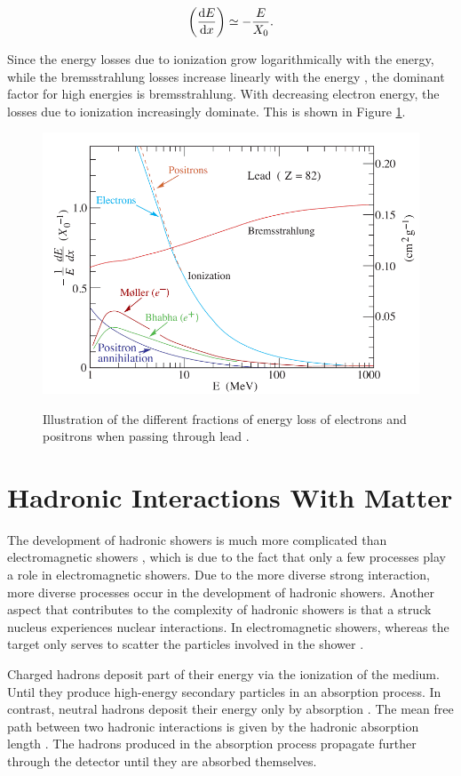 \documentclass[12pt, a4paper]{thesis}
\begin{document}
\begin{align}
\left( \dv{E}{x} \right) \simeq - \frac{E}{X_0}.
\end{align}

Since the energy losses due to ionization grow logarithmically with
the energy, while the bremsstrahlung losses increase linearly with the
energy \cite{PhysRevD.98.030001}, the dominant factor for high
energies is bremsstrahlung. With decreasing electron energy, the
losses due to ionization increasingly dominate. This is shown in
Figure \ref{bremsstrahlung}.

\begin{figure}[htbp]
\centering
\includegraphics[width=0.8 \textwidth]{../images/bremsstrahlung.png}
\label{bremsstrahlung}
\caption{ Illustration of the different fractions of energy loss of
  electrons and positrons when passing through lead
  \cite{PhysRevD.98.030001}.}
\end{figure}

\section{Hadronic Interactions With Matter}
\label{sec:org39e1a53}

The development of hadronic showers is much more complicated than
electromagnetic showers \cite{wigman18}, which is due to the fact that
only a few processes play a role in electromagnetic showers.  Due to
the more diverse strong interaction, more diverse processes occur in
the development of hadronic showers. Another aspect that contributes
to the complexity of hadronic showers is that a struck nucleus
experiences nuclear interactions. In electromagnetic showers, whereas
the target only serves to scatter the particles involved in the shower
\cite{wigman18}.

Charged hadrons deposit part of their energy via the ionization of the
medium. Until they produce high-energy secondary particles in an absorption
process.  In contrast, neutral hadrons deposit their energy only by absorption
\cite{wigman18,fabjan03}. The mean free path between two hadronic interactions is
given by the hadronic absorption length \cite{fabjan03}. The hadrons produced in
the absorption process propagate further through the detector until they are
absorbed themselves.
\end{document}
